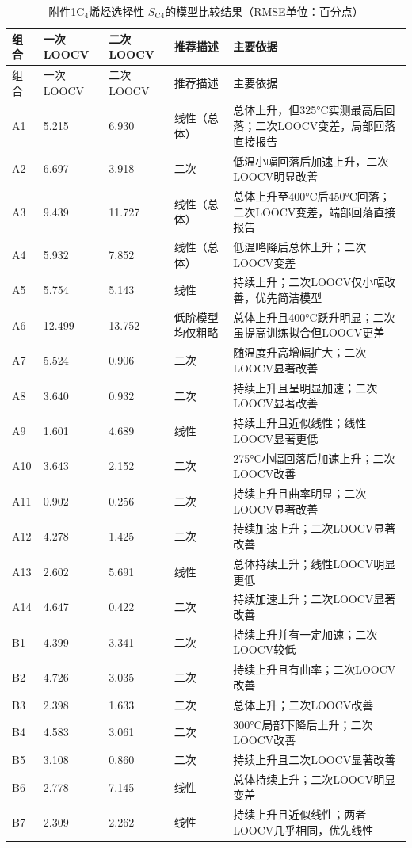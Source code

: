 \begin{longtable}{C{0.07\textwidth}C{0.11\textwidth}C{0.11\textwidth}L{0.16\textwidth}L{0.42\textwidth}}
\caption{附件1$\mathrm{C}_4$烯烃选择性 $S_{\mathrm{C4}}$的模型比较结果（RMSE单位：百分点）}\label{tab:q1-selectivity-comparison}\\
\toprule
组合 & 一次LOOCV & 二次LOOCV & 推荐描述 & 主要依据 \\
\midrule
\endfirsthead
\toprule
组合 & 一次LOOCV & 二次LOOCV & 推荐描述 & 主要依据 \\
\midrule
\endhead
A1 & 5.215 & 6.930 & 线性（总体） & 总体上升，但325°C实测最高后回落；二次LOOCV变差，局部回落直接报告 \\
A2 & 6.697 & 3.918 & 二次 & 低温小幅回落后加速上升，二次LOOCV明显改善 \\
A3 & 9.439 & 11.727 & 线性（总体） & 总体上升至400°C后450°C回落；二次LOOCV变差，端部回落直接报告 \\
A4 & 5.932 & 7.852 & 线性（总体） & 低温略降后总体上升；二次LOOCV变差 \\
A5 & 5.754 & 5.143 & 线性 & 持续上升；二次LOOCV仅小幅改善，优先简洁模型 \\
A6 & 12.499 & 13.752 & 低阶模型均仅粗略 & 总体上升且400°C跃升明显；二次虽提高训练拟合但LOOCV更差 \\
A7 & 5.524 & 0.906 & 二次 & 随温度升高增幅扩大；二次LOOCV显著改善 \\
A8 & 3.640 & 0.932 & 二次 & 持续上升且呈明显加速；二次LOOCV显著改善 \\
A9 & 1.601 & 4.689 & 线性 & 持续上升且近似线性；线性LOOCV显著更低 \\
A10 & 3.643 & 2.152 & 二次 & 275°C小幅回落后加速上升；二次LOOCV改善 \\
A11 & 0.902 & 0.256 & 二次 & 持续上升且曲率明显；二次LOOCV显著改善 \\
A12 & 4.278 & 1.425 & 二次 & 持续加速上升；二次LOOCV显著改善 \\
A13 & 2.602 & 5.691 & 线性 & 总体持续上升；线性LOOCV明显更低 \\
A14 & 4.647 & 0.422 & 二次 & 持续加速上升；二次LOOCV显著改善 \\
B1 & 4.399 & 3.341 & 二次 & 持续上升并有一定加速；二次LOOCV较低 \\
B2 & 4.726 & 3.035 & 二次 & 持续上升且有曲率；二次LOOCV改善 \\
B3 & 2.398 & 1.633 & 二次 & 总体上升；二次LOOCV改善 \\
B4 & 4.583 & 3.061 & 二次 & 300°C局部下降后上升；二次LOOCV改善 \\
B5 & 3.108 & 0.860 & 二次 & 持续上升且二次LOOCV显著改善 \\
B6 & 2.778 & 7.145 & 线性 & 总体持续上升；二次LOOCV明显变差 \\
B7 & 2.309 & 2.262 & 线性 & 持续上升且近似线性；两者LOOCV几乎相同，优先线性 \\
\bottomrule
\end{longtable}
